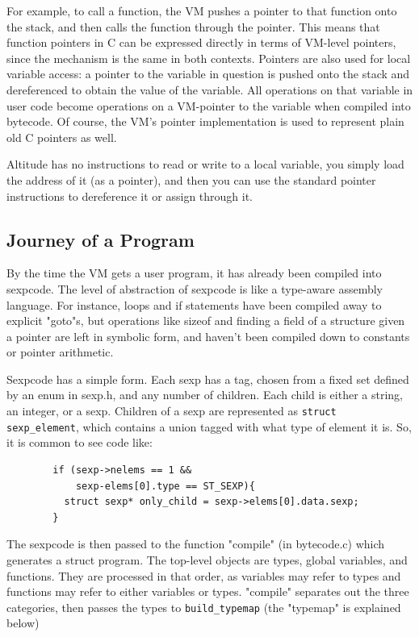 \documentclass[10pt,a4paper]{report}
\begin{document}
For example, to call a function, the VM pushes a pointer to that function onto the stack, and then calls the function through the pointer. This means that function pointers in C can be expressed directly in terms of VM-level pointers, since the mechanism is the same in both contexts. Pointers are also used for local variable access: a pointer to the variable in question is pushed onto the stack and dereferenced to obtain the value of the variable. All operations on that variable in user code become operations on a VM-pointer to the variable when compiled into bytecode. Of course, the VM's pointer implementation is used to represent plain old C pointers as well.

Altitude has no instructions to read or write to a local variable, you simply load the address of it (as a pointer), and then you can use the standard pointer instructions to dereference it or assign through it.

\subsection{Journey of a Program}

By the time the VM gets a user program, it has already been compiled into sexpcode. The level of abstraction of sexpcode is like a type-aware assembly language. For instance, loops and if statements have been compiled away to explicit "goto"s, but operations like sizeof and finding a field of a structure given a pointer are left in symbolic form, and haven't been compiled down to constants or pointer arithmetic.

Sexpcode has a simple form. Each sexp has a tag, chosen from a fixed set defined by an enum in sexp.h, and any number of children. Each child is either a string, an integer, or a sexp. Children of a sexp are represented as \lstinline{struct sexp_element}, which contains a union tagged with what type of element it is. So, it is common to see code like:

\begin{verbatim}
        if (sexp->nelems == 1 &&
            sexp-elems[0].type == ST_SEXP){
          struct sexp* only_child = sexp->elems[0].data.sexp;
        }
\end{verbatim}

The sexpcode is then passed to the function "compile" (in bytecode.c) which generates a struct program. The top-level objects are types, global variables, and functions. They are processed in that order, as variables may refer to types and functions may refer to either variables or types. "compile" separates out the three categories, then passes the types to \lstinline{build_typemap} (the "typemap" is explained below)
\end{document}
